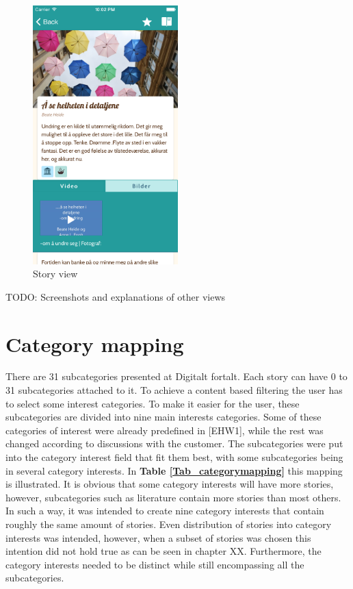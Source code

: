 \begin{figure}[h!]
	\centering
	\includegraphics[width=0.5\textwidth]{fig/story_view}
	\caption{Story view}
	\label{story_view}
\end{figure}

TODO: Screenshots and explanations of other views

\section{Category mapping} 

There are 31 subcategories presented at Digitalt fortalt. Each story can have 0 to 31 subcategories attached to it. To achieve a content based filtering the user has to select some interest categories. To make it easier for the user, these subcategories are divided into nine main interests categories. Some of these categories of interest were already predefined in [EHW1], while the rest was changed according to discussions with the customer. The subcategories were put into the category interest field that fit them best, with some subcategories being in several category interests. In \textbf{Table \ref{Tab_categorymapping}} this mapping is illustrated. It is obvious that some category interests will have more stories, however, subcategories such as literature contain more stories than most others. In such a way, it was intended to create nine category interests that contain roughly the same amount of stories. Even distribution of stories into category interests was intended, however, when a subset of stories was chosen this intention did not hold true as can be seen in chapter XX. Furthermore, the category interests needed to be distinct while still encompassing all the subcategories. 

